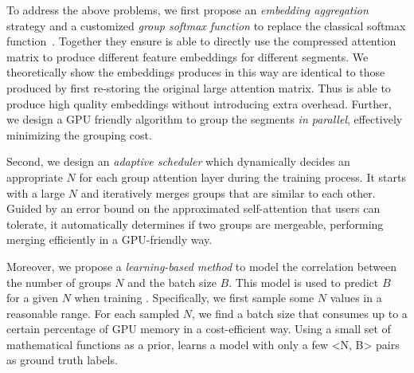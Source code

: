 



% 
To address the above problems, we first propose an {\it embedding aggregation} strategy and a customized {\it group softmax function} to replace the classical softmax function~\cite{DBLP:conf/nips/VaswaniSPUJGKP17}. Together they ensure \system is able to directly use the compressed attention matrix to produce different feature embeddings for different segments. We theoretically show the embeddings \system produces in this way are identical to those produced by first re-storing the original large attention matrix. Thus \system is able to produce high quality embeddings without introducing extra overhead.
Further, we design a GPU friendly algorithm to group the segments {\it in parallel}, effectively minimizing the grouping cost.


Second, we design an {\it adaptive scheduler} which dynamically decides an appropriate $N$ for each group attention layer during the training process. It starts with a large $N$ and iteratively merges groups that are similar to each other. Guided by an error bound on the approximated self-attention that users can tolerate, it automatically determines if two groups are mergeable, performing merging efficiently in a GPU-friendly way.


Moreover, we propose a {\it learning-based method} to model the correlation between the number of groups $N$ and the batch size $B$. This model is used to predict $B$ for a given $N$ when training \system.
Specifically, we first sample some $N$ values in a reasonable range. For each sampled $N$, we find a batch size that consumes up to a certain percentage of GPU memory in a cost-efficient way. Using a small set of mathematical functions as a prior, \system learns a model with only a few <N, B> pairs as ground truth labels.    

